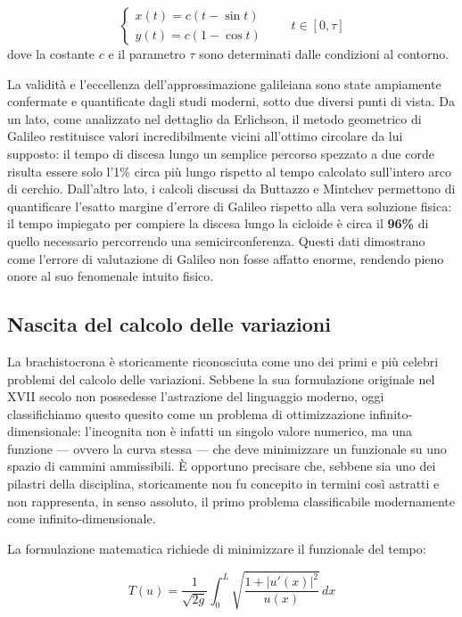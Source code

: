 \documentclass[a4paper,12pt]{article} %
\begin{document}
\[
    \begin{cases}
        x(t) = c(t - \sin t) \\
        y(t) = c(1 - \cos t)
    \end{cases}
    \qquad t \in [0, \tau]
\]
dove la costante $c$ e il parametro $\tau$ sono determinati dalle condizioni al contorno.
\vspace{2em}

La validità e l'eccellenza dell'approssimazione galileiana sono state ampiamente confermate e quantificate dagli studi moderni, sotto due diversi punti di vista. Da un lato, come analizzato nel dettaglio da Erlichson, il metodo geometrico di Galileo restituisce valori incredibilmente vicini all'ottimo circolare da lui supposto: il tempo di discesa lungo un semplice percorso spezzato a due corde risulta essere solo l'1\% circa più lungo rispetto al tempo calcolato sull'intero arco di cerchio. Dall'altro lato, i calcoli discussi da Buttazzo e Mintchev permettono di quantificare l'esatto margine d'errore di Galileo rispetto alla vera soluzione fisica: il tempo impiegato per compiere la discesa lungo la cicloide è circa il \textbf{96\%} di quello necessario percorrendo una semicirconferenza. Questi dati dimostrano come l'errore di valutazione di Galileo non fosse affatto enorme, rendendo pieno onore al suo fenomenale intuito fisico.

\subsection{Nascita del calcolo delle variazioni}

La brachistocrona è storicamente riconosciuta come uno dei primi e più celebri problemi del calcolo delle variazioni. Sebbene la sua formulazione originale nel XVII secolo non possedesse l'astrazione del linguaggio moderno, oggi classifichiamo questo quesito come un problema di ottimizzazione infinito-dimensionale: l'incognita non è infatti un singolo valore numerico, ma una funzione — ovvero la curva stessa — che deve minimizzare un funzionale su uno spazio di cammini ammissibili. È opportuno precisare che, sebbene sia uno dei pilastri della disciplina, storicamente non fu concepito in termini così astratti e non rappresenta, in senso assoluto, il primo problema classificabile modernamente come infinito-dimensionale.

La formulazione matematica richiede di minimizzare il funzionale del tempo:

\[
    T(u) = \frac{1}{\sqrt{2g}} \int_{0}^{L} \sqrt{\frac{1 + |u'(x)|^2}{u(x)}} \, dx
\]
\end{document}
